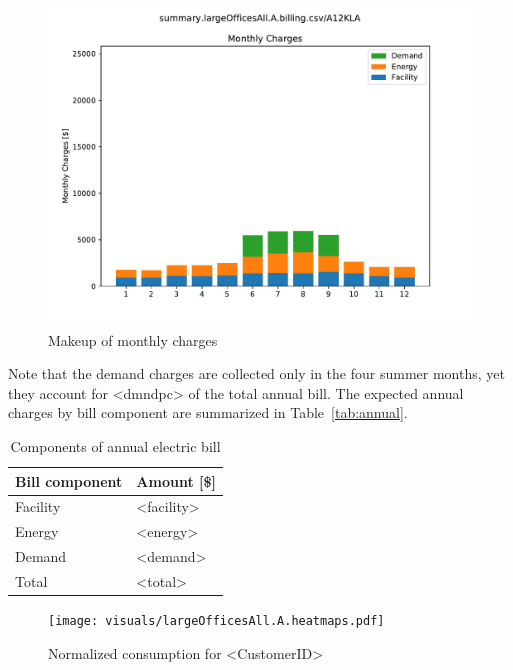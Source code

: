 \documentclass[11pt]{article}
\begin{document}
\begin{figure}[!h]
\centering
\includegraphics[width=\columnwidth, page=1, trim=0in 0.45in 0in 0.45in, clip]{visuals/largeOfficesAll.A.boxplots.pdf}
\caption{Makeup of monthly charges}
\label{fig:bars}
\end{figure}

Note that the demand charges are collected only in the four summer months, yet they account for <dmndpc> of the total annual bill. The expected annual charges by bill component are summarized in Table~\ref{tab:annual}.

\begin{table}[th!]
  \centering
  \caption{Components of annual electric bill}
  \vspace{1.5ex}
  \label{tab:energy}
  \begin{tabular}{ll}
    Bill component & Amount [\$] \\
    \midrule
    Facility & <facility> \\
    Energy & <energy> \\
    Demand & <demand> \\
    \midrule
    Total & <total>
  \end{tabular}
\end{table}
\clearpage

\pagestyle{energy}

\begin{figure}[!h]
\centering
\texttt{[image: visuals/largeOfficesAll.A.heatmaps.pdf]}
\caption{Normalized consumption for <CustomerID>}
\label{fig:heatmap}
\end{figure}
\end{document}

